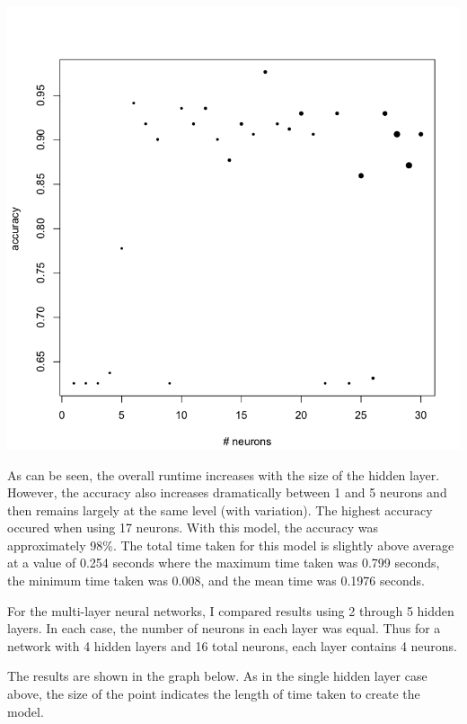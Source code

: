 \documentclass[11pt]{article}
\begin{document}
\begin{enumerate}
\begin{center}
\includegraphics[scale=0.35]{pix/nnet_acc_size}
\end{center}

As can be seen, the overall runtime increases with the size of the hidden layer. 
However, the accuracy also increases dramatically between 1 and 5 neurons and then 
remains largely at the same level (with variation). The highest accuracy occured when 
using 17 neurons. With this model, the accuracy was approximately 98\%. The total time 
taken for this model is slightly above average at a value of 0.254 seconds 
where the maximum time taken was
0.799 seconds, the minimum time taken was 0.008, and the mean time was 0.1976 seconds.

For the multi-layer neural networks, I compared results using 2 through 5 hidden layers. 
In each case, the number of neurons in each layer was equal. Thus for a network with 
4 hidden layers and 16 total neurons, each layer contains 4 neurons. 

The results are shown in the graph below. As in the 
single hidden layer case above, the size of the point indicates the length of time taken 
to create the model. 


\end{enumerate}
\end{document}
